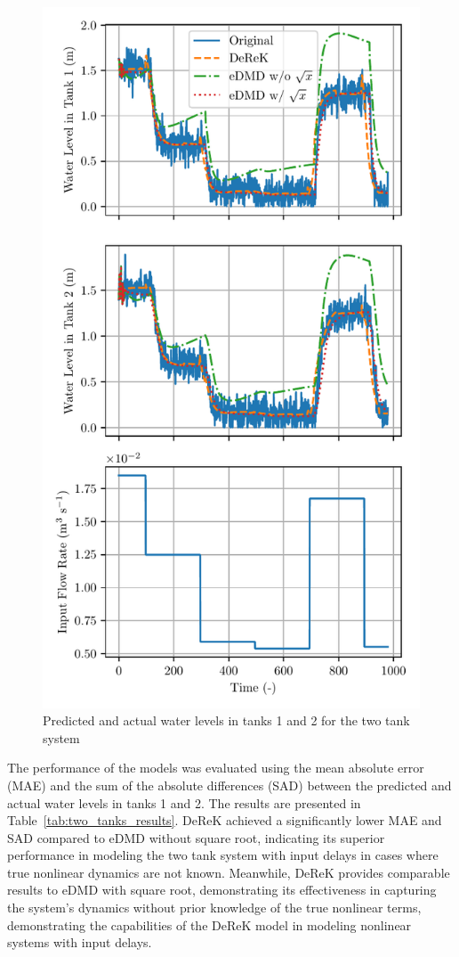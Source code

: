 \documentclass[conference]{IEEEtran}
\begin{document}
\begin{figure}[htbp]\label{fig:two_tanks_results}
    \centerline{\includegraphics[width=\linewidth]{figures/dmdc_multipred-p0-q0-hm20-hl0.pdf}}
    \caption{Predicted and actual water levels in tanks 1 and 2 for the two tank system}
\end{figure}

The performance of the models was evaluated using the mean absolute error (MAE) and the sum of the absolute differences (SAD) between the predicted and actual water levels in tanks 1 and 2. The results are presented in Table~\ref{tab:two_tanks_results}. DeReK achieved a significantly lower MAE and SAD compared to eDMD without square root, indicating its superior performance in modeling the two tank system with input delays in cases where true nonlinear dynamics are not known. Meanwhile, DeReK provides comparable results to eDMD with square root, demonstrating its effectiveness in capturing the system's dynamics without prior knowledge of the true nonlinear terms, demonstrating the capabilities of the DeReK model in modeling nonlinear systems with input delays.
\end{document}
